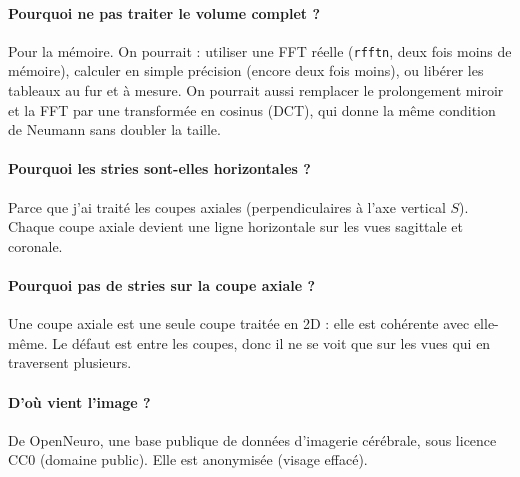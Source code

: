 \documentclass[11pt,a4paper]{article}
\begin{document}
\paragraph{Pourquoi ne pas traiter le volume complet ?} Pour la mémoire. On pourrait : utiliser une FFT
réelle (\texttt{rfftn}, deux fois moins de mémoire), calculer en simple précision (encore deux fois
moins), ou libérer les tableaux au fur et à mesure. On pourrait aussi remplacer le prolongement miroir et
la FFT par une transformée en cosinus (DCT), qui donne la même condition de Neumann sans doubler la taille.

\paragraph{Pourquoi les stries sont-elles horizontales ?} Parce que j'ai traité les coupes axiales
(perpendiculaires à l'axe vertical $S$). Chaque coupe axiale devient une ligne horizontale sur les vues
sagittale et coronale.

\paragraph{Pourquoi pas de stries sur la coupe axiale ?} Une coupe axiale est une seule coupe traitée en
2D : elle est cohérente avec elle-même. Le défaut est entre les coupes, donc il ne se voit que sur les
vues qui en traversent plusieurs.

\paragraph{D'où vient l'image ?} De OpenNeuro, une base publique de données d'imagerie cérébrale, sous
licence CC0 (domaine public). Elle est anonymisée (visage effacé).
\end{document}
